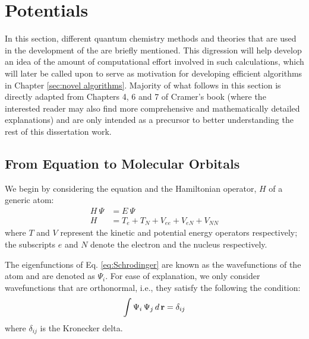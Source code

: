     \section{\Abinitio{} Potentials}
        In this section, different quantum chemistry methods and theories that are used in the development of the \abinitio{} \PESs{} are briefly mentioned. This digression will help develop an idea of the amount of computational effort involved in such calculations, which will later be called upon to serve as motivation for developing efficient algorithms in Chapter \ref{sec:novel algorithms}. Majority of what follows in this section is directly adapted from Chapters 4, 6 and 7 of Cramer's book \cite{Cramer} (where the interested reader may also find more comprehensive and mathematically detailed explanations) and are only intended as a precursor to better understanding the rest of this dissertation work. \\
        \subsection{From \Schrodinger{} Equation to Molecular Orbitals}
            We begin by considering the \Schrodinger{} equation and the Hamiltonian operator, $H$ of a generic atom:
            \begin{equation}\label{eq:Schrodinger}
                \begin{aligned}
                    H~\Psi &= E~\Psi \\
                    H &= T_e + T_N + V_{ee} + V_{eN} + V_{NN}
                \end{aligned}
            \end{equation}
            where $T$ and $V$ represent the kinetic and potential energy operators respectively; the subscripts $e$ and $N$ denote the electron and the nucleus respectively.

            The eigenfunctions of Eq. \eqref{eq:Schrodinger} are known as the wavefunctions of the atom and are denoted as $\Psi_i$. For ease of explanation, we only consider wavefunctions that are orthonormal, i.e., they satisfy the following the condition:
            \begin{equation}\label{eq:orthonormality}
                \int \Psi_i\, \Psi_j\, d\, {\mathbf {r}} = \delta_{ij}
            \end{equation}
            where $\delta_{ij}$ is the Kronecker delta.

